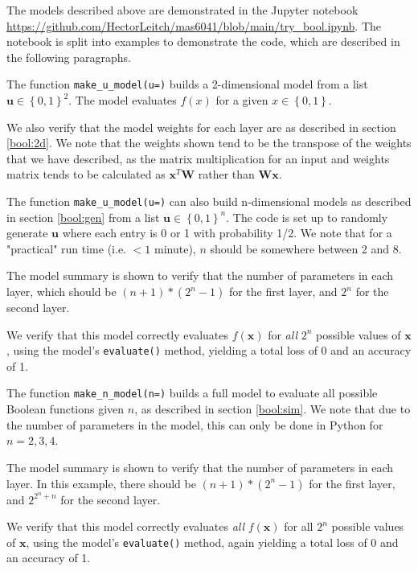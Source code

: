 \documentclass{somasmsc}
\begin{document}
The models described above are demonstrated in the Jupyter notebook \url{https://github.com/HectorLeitch/mas6041/blob/main/try_bool.ipynb}. The notebook is split into examples to demonstrate the code, which are described in the following paragraphs.

\begin{exa}
The function \verb|make_u_model(u=)| builds a 2-dimensional model from a list $\pmb{u} \in \left\{0, 1\right\}^2$. The model evaluates $f(x)$ for a given $x \in \left\{0, 1\right\}$.

We also verify that the model weights for each layer are as described in section \ref{bool:2d}. We note that the weights shown tend to be the transpose of the weights that we have described, as the matrix multiplication for an input and weights matrix tends to be calculated as $\pmb{x}^T\mathbf{W}$ rather than $\mathbf{W}\pmb{x}$.
\end{exa}

\begin{exa}
The function \verb|make_u_model(u=)| can also build n-dimensional models as described in section \ref{bool:gen} from a list $\pmb{u} \in \left\{0, 1\right\}^n$. The code is set up to randomly generate $\pmb{u}$ where each entry is 0 or 1 with probability 1/2. We note that for a "practical" run time (i.e. $<1$ minute), $n$ should be somewhere between 2 and 8.

The model summary is shown to verify that the number of parameters in each layer, which should be $\left(n+1\right)*\left(2^n-1\right)$ for the first layer, and $2^n$ for the second layer.

We verify that this model correctly evaluates $f(\pmb{x})$ for \textit{all} $2^n$ possible values of $\pmb{x}$, using the model's \verb|evaluate()| method, yielding a total loss of 0 and an accuracy of 1.
\end{exa}

\begin{exa}
The function \verb|make_n_model(n=)| builds a full model to evaluate all possible Boolean functions given $n$, as described in section \ref{bool:sim}. We note that due to the number of parameters in the model, this can only be done in Python for $n=2,3,4$.

The model summary is shown to verify that the number of parameters in each layer. In this example, there should be $\left(n+1\right)*\left(2^n-1\right)$ for the first layer, and $2^{2^n+n}$ for the second layer.

We verify that this model correctly evaluates \textit{all} $f(\pmb{x})$ for all $2^n$ possible values of $\pmb{x}$, using the model's \verb|evaluate()| method, again yielding a total loss of 0 and an accuracy of 1.
\end{exa}
\end{document}
